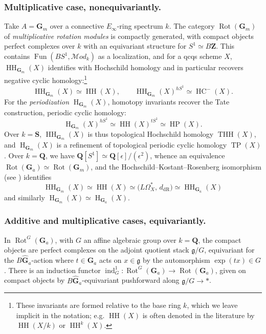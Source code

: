 \documentclass[12pt, oneside]{amsart}
\numberwithin{equation}{section}
\theoremstyle{remark}
\theoremstyle{plain}
\newcommand{\MOD}{\mathcal{M}\textit{od}}
\newcommand{\GGhat}{\widehat{\mathbf{G}}}
\newcommand{\GGa}{\mathbf{G}_{a}}
\newcommand{\GGm}{\mathbf{G}_{m}}
\newcommand{\bZ}{\mathbf{Z}}
\newcommand{\bQ}{\mathbf{Q}}
\newcommand{\HH}{\operatorname{HH}}
\newcommand{\Hcoh}{\operatorname{H}}
\newcommand{\Rot}{\operatorname{Rot}}
\begin{document}
\subsubsection{Multiplicative case, nonequivariantly.}\label{sssec:intro/coh/mult}
Take $A=\GGm$ over a connective $E_\infty$-ring spectrum $k$.
The category $\Rot(\GGm)$ of \emph{multiplicative rotation modules} is compactly generated, with compact objects perfect complexes over $k$ with an equivariant structure for $S^1 \simeq B\bZ$.
This contains $\operatorname{Fun}(BS^1, \MOD_k)$ as a localization, and for a qcqs scheme $X$, $\HH_{\GGm}(X)$ identifies with Hochschild homology and in particular recovers negative cyclic homology:\footnote{%
  These invariants are formed relative to the base ring $k$, which we leave implicit in the notation; e.g. $\operatorname{HH}(X)$ is often denoted in the literature by $\operatorname{HH}(X/k)$ or $\operatorname{HH}^k(X)$.
}
\[
  \HH_{\GGm}(X)
  \simeq \operatorname{HH}(X),
  \qquad
  \HH_{\GGm}(X)^{hS^1}
  \simeq \operatorname{HC}^-(X).
\]
For the \emph{periodization} $\Hcoh_{\GGm}(X)$, homotopy invariants recover the Tate construction, periodic cyclic homology:
\[
  \Hcoh_{\GGm}(X)^{hS^1}
  \simeq \operatorname{HH}(X)^{tS^1}
  \simeq \operatorname{HP}(X).
\]
Over $k=\mathbf{S}$, $\HH_{\GGm}(X)$ is thus topological Hochschild homology $\operatorname{THH}(X)$, and $\Hcoh_{\GGm}(X)$ is a refinement of topological periodic cyclic homology $\operatorname{TP}(X)$.
Over $k=\bQ$, we have $\bQ[S^1] \simeq \bQ[\epsilon]/(\epsilon^2)$, whence an equivalence $\Rot(\GGa) \simeq \Rot(\GGm)$, and the Hochschild--Kostant--Rosenberg isomorphism (see \cite[Cor.~3.2]{TVHKR}) identifies
\begin{equation}\label{eq:add=mult nonequiv}
  \HH_{\GGm}(X)
  \simeq \operatorname{HH}(X)
  \simeq \bigl(L\Omega^*_{X},\, d_{\mathrm{dR}}\bigr)
  \simeq \HH_{\GGa}(X)
\end{equation}
and similarly $\Hcoh_{\GGm}(X) \simeq \Hcoh_{\GGa}(X)$.

\subsubsection{Additive and multiplicative cases, equivariantly.}\label{sssec:intro/coh/equiv}
In $\Rot^G(\GGa)$, with $G$ an affine algebraic group over $k=\bQ$, the compact objects are perfect complexes on the adjoint quotient stack $\mathfrak{g}/G$, equivariant for the $B\GGhat_a$-action where $t \in \GGhat_a$ acts on $x \in \mathfrak{g}$ by the automorphism $\exp(tx) \in G$.
There is an induction functor $\operatorname{ind}_G^1 : \Rot^G(\GGa) \to \Rot(\GGa)$, given on compact objects by $B\GGhat_a$-equivariant pushforward along $\mathfrak{g}/G \to *$.
\end{document}
